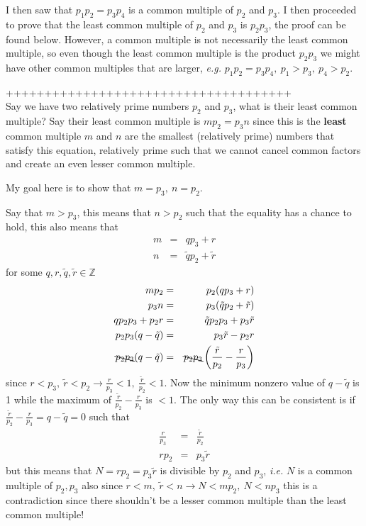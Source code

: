 \documentclass[aps,preprint,preprintnumbers,nofootinbib,showpacs,prd]{revtex4-1}
\newcommand{\ie}{{\it i.e.} }
\newcommand{\eg}{{\it e.g.} }
\newcommand{\nbea}{\begin{eqnarray*}}
\newcommand{\neea}{\end{eqnarray*}}
\begin{document}
I then saw that $p_1 p_2 = p_3 p_4$ is a common multiple of $p_2$ and $p_3$. I then proceeded to prove that the least common multiple of $p_2$ and $p_3$ is $p_2 p_3$, the proof can be found below. However, a common multiple is not necessarily the least common multiple, so even though the least common multiple is the product $p_2 p_3$ we might have other common multiples that are larger, \eg $p_1 p_2 = p_3 p_4, ~p_1 > p_3, ~p_4 > p_2$.

+++++++++++++++++++++++++++++++++++++\\

Say we have two relatively prime numbers $p_2$ and $p_3$, what is their least common multiple? Say their least common multiple is $m p_2 = p_3 n$ since this is the {\bf least} common multiple $m$ and $n$ are the smallest (relatively prime) numbers that satisfy this equation, relatively prime such that we cannot cancel common factors and create an even lesser common multiple.

My goal here is to show that $m = p_3,~n = p_2$.

Say that $m >p_3$, this means that $n > p_2$ such that the equality has a chance to hold, this also means that
%
\nbea
m & = & q p_3 + r \\
n & = & \tilde q p_2 + \tilde r
\neea
%
for some $q,r,\tilde q, \tilde r \in \mathbb{Z}$
%
\nbea
m p_2 & = & p_2 (q p_3 + r) \\
p_3 n & = & p_3 (\tilde q p_2 + \tilde r) \\
q p_2 p_3 + p_2 r & = & \tilde q p_2 p_3 + p_3 \tilde r \\
p_2 p_3 (q - \tilde q) & = & p_3 \tilde r - p_2 r\\
\bcancel{p_2 p_3} (q - \tilde q)  & = & \bcancel{p_2 p_3} \left (\frac{\tilde r}{p_2} - \frac{r}{p_3} \right )
\neea
%
since $r < p_3, ~ \tilde r < p_2 \to \frac{r}{p_3} < 1, ~ \frac{\tilde r}{p_2} < 1$. Now the minimum nonzero value of $q - \tilde q$ is 1 while the maximum of $\frac{\tilde r}{p_2} - \frac{r}{p_3}$ is $< 1$. The only way this can be consistent is if $\frac{\tilde r}{p_2} - \frac{r}{p_3} = q - \tilde q = 0$ such that
%
\nbea
\frac{r}{p_3} & = & \frac{\tilde r}{p_2} \\
r p_2 & = & p_3 \tilde r 
\neea
%
but this means that $N = r p_2 = p_3 \tilde r$ is divisible by $p_2$ and $p_3$, \ie $N$ is a common multiple of $p_2, p_3$ also since $r < m, ~ \tilde r < n \rightarrow N < mp_2, ~N < n p_3$ this is a contradiction since there shouldn't be a lesser common multiple than the least common multiple!
\end{document}
